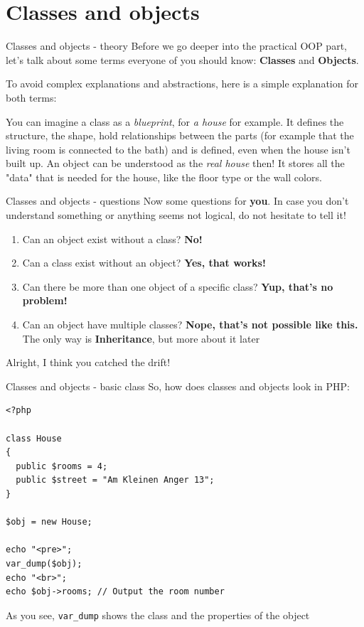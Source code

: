 \section{Classes and objects}

\begin{frame}{Classes and objects - theory}
	Before we go deeper into the practical OOP part, let's talk about some terms everyone of you should know: \textbf{Classes} and \textbf{Objects}. \pause
	
	To avoid complex explanations and abstractions, here is a simple explanation for both terms: \pause
	
	You can imagine a class as a \emph{blueprint}, for \emph{a house} for example. It defines the structure, the shape, hold relationships between the parts (for example that the living room is connected to the bath) and is defined, even when the house isn't built up. \pause
	An object can be understood as the \emph{real house} then! It stores all the "data" that is needed for the house, like the floor type or the wall colors. \pause
\end{frame}

\begin{frame}{Classes and objects - questions}
	Now some questions for \textbf{you}. In case you don't understand something or anything seems not logical, do not hesitate to tell it!
	
	\begin{enumerate}
	\item Can an object exist without a class? \pause \textbf{No!}
	\item Can a class exist without an object? \pause \textbf{Yes, that works!}
	\item Can there be more than one object of a specific class? \pause \textbf{Yup, that's no problem!}
	\item Can an object have multiple classes? \pause \textbf{Nope, that's not possible like this.}  The only way is \textbf{Inheritance}, but more about it later
	\end{enumerate} \pause
	
	Alright, I think you catched the drift!
	
\end{frame}

\begin{frame}[fragile]{Classes and objects - basic class}
	So, how does classes and objects look in PHP: \pause
	\begin{lstlisting}
<?php
 
class House
{
  public $rooms = 4;
  public $street = "Am Kleinen Anger 13";
}
 
$obj = new House;

echo "<pre>";
var_dump($obj);
echo "<br>";
echo $obj->rooms; // Output the room number
\end{lstlisting}
	
\pause As you see, \texttt{var\_{}dump} shows the class and the properties of the object
\end{frame}

